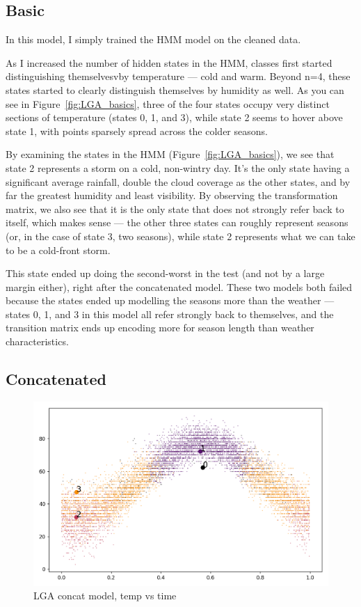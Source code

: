\documentclass[a4paper]{article}
\begin{document}
\subsection{Basic}

In this model, I simply trained the HMM model on the cleaned data.

As I increased the number of hidden states in the HMM, classes first started distinguishing themselvesvby temperature --- cold and warm. Beyond n=4, these states started to clearly distinguish themselves by humidity as well. As you can see in Figure~\ref{fig:LGA_basics}, three of the four states occupy very distinct sections of temperature (states 0, 1, and 3), while state 2 seems to hover above state 1, with points sparsely spread across the colder seasons.

By examining the states in the HMM (Figure~\ref{fig:LGA_basics}), we see that state 2 represents a storm on a cold, non-wintry day. It's the only state having a significant average rainfall, double the cloud coverage as the other states, and by far the greatest humidity and least visibility. By observing the transformation matrix, we also see that it is the only state that does not strongly refer back to itself, which makes sense --- the other three states can roughly represent seasons (or, in the case of state 3, two seasons), while state 2 represents what we can take to be a cold-front storm.

This state ended up doing the second-worst in the test (and not by a large margin either), right after the concatenated model. These two models both failed because the states ended up modelling the seasons more than the weather --- states 0, 1, and 3 in this model all refer strongly back to themselves, and the transition matrix ends up encoding more for season length than weather characteristics.





\subsection{Concatenated}
\begin{figure}[t]
  \centering
  \includegraphics[width=\linewidth]{../png/models/LGA-concat-temperature4.png}
  \caption{LGA concat model, temp vs time}
  \label{fig:LGA_concat}
\end{figure}
\end{document}
